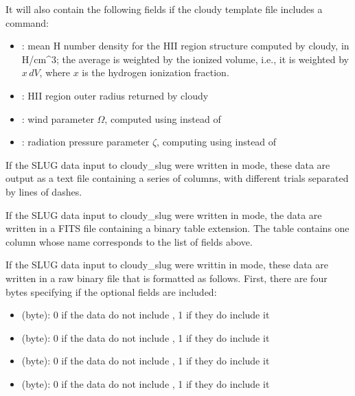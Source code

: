 \documentclass[letterpaper,10pt,english]{sphinxmanual}
\begin{document}
It will also contain the following fields if the cloudy template file
includes a  command:
\begin{itemize}
\item {} 
: mean H number density for the HII region structure
computed by cloudy, in H/cm\textasciicircum{}3; the average is weighted by the
ionized volume, i.e., it is weighted by \(x\, dV\), where
\(x\) is the hydrogen ionization fraction.

\item {} 
: HII region outer radius returned by cloudy

\item {} 
: wind parameter \(\Omega\), computed using
 instead of 

\item {} 
: radiation pressure parameter \(\zeta\), computing
using  instead of 

\end{itemize}

If the SLUG data input to cloudy\_slug were written in  mode,
these data are output as a text file containing a series of columns,
with different trials separated by lines of dashes.

If the SLUG data input to cloudy\_slug were written in  mode,
the data are written in a FITS file containing a binary table
extension. The table contains one column whose name corresponds to the
list of fields above.

If the SLUG data input to cloudy\_slug were writtin in  mode,
these data are written in a raw binary file that is formatted as
follows. First, there are four bytes specifying if the optional fields
are included:
\begin{itemize}
\item {} 
 (byte): 0 if the data do not include , 1 if
they do include it

\item {} 
 (byte): 0 if the data do not include , 1 if
they do include it

\item {} 
 (byte): 0 if the data do not include , 1 if
they do include it

\item {} 
 (byte): 0 if the data do not include , 1 if
they do include it

\end{itemize}
\end{document}
